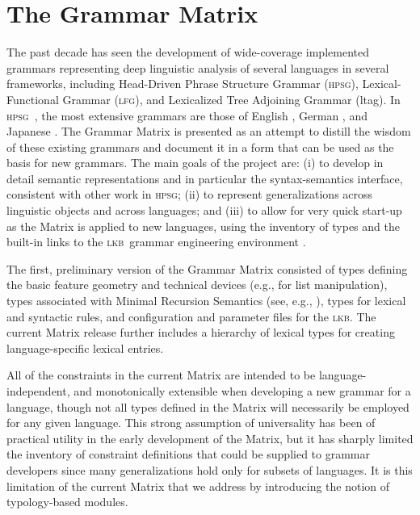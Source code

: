 \documentclass[11pt]{article}
\newcommand{\hpsg}{\textsc{hpsg}}
\newcommand{\lkb}{\textsc{lkb}}
\newcommand{\lfg}{\textsc{lfg}}
\begin{document}
\section{The Grammar Matrix}

The past decade has seen the development of wide-coverage implemented
grammars representing deep linguistic analysis of several languages in
several frameworks, including Head-Driven Phrase Structure Grammar
(\hpsg), Lexical-Functional Grammar (\lfg), and Lexicalized Tree
Adjoining Grammar ({\sc ltag}). In \hpsg\ \cite{Pol:Sag:94}, the most
extensive grammars are those of English \cite{Flickinger:00}, German
\cite{Mue:Kap:00}, and Japanese \cite{Siegel:00,Siegel:Bender:02}.
The Grammar Matrix \cite{Ben:Fli:Oe:02} is presented as 
an attempt to distill the
wisdom of these existing grammars and document it in a form that can
be used as the basis for new grammars. The main goals of the project
are: (i) to develop in detail semantic representations and in particular 
the syntax-semantics interface, consistent with other work in \hpsg; 
(ii) to represent generalizations across linguistic objects
and across languages; and (iii) to allow for very quick start-up as 
the Matrix is applied to new languages, using the inventory of types and
the built-in links to the \lkb\ grammar engineering environment
\cite{Copestake:02}.

The first, preliminary version of the Grammar Matrix 
consisted of types defining the basic feature geometry and technical
devices (e.g., for list manipulation), types associated with Minimal
Recursion Semantics (see, e.g., \cite{Cop:Las:Fli:01}), types for
lexical and syntactic rules, and configuration and parameter
files for the \lkb.  The current Matrix release further 
includes a hierarchy of lexical types for creating language-specific 
lexical entries.

All of the constraints in the current Matrix are intended to be 
language-independent, and monotonically extensible when developing a
new grammar for a language, though not all types defined in the Matrix
will necessarily be employed for any given language.  This strong 
assumption of universality has been of practical utility in the early
development of the Matrix, but it has sharply limited the inventory of
constraint definitions that could be supplied to grammar developers
since many generalizations hold only for subsets of languages.  It is
this limitation of the current Matrix that we address by introducing
the notion of typology-based modules.
\end{document}
